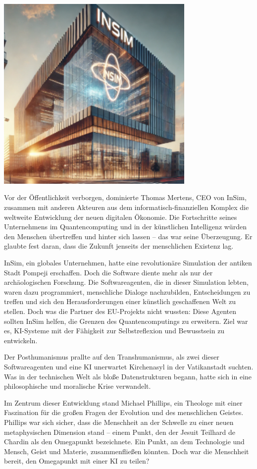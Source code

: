 \documentclass[
]{article}
\begin{document}
\includegraphics[width=3.79167in,height=3.78011in]{media/image10.png}

Vor der Öffentlichkeit verborgen, dominierte Thomas Mertens, CEO von
InSim, zusammen mit anderen Akteuren aus dem informatisch-finanziellen
Komplex die weltweite Entwicklung der neuen digitalen Ökonomie. Die
Fortschritte seines Unternehmens im Quantencomputing und in der
künstlichen Intelligenz würden den Menschen übertreffen und hinter sich
lassen -- das war seine Überzeugung. Er glaubte fest daran, dass die
Zukunft jenseits der menschlichen Existenz lag.

InSim, ein globales Unternehmen, hatte eine revolutionäre Simulation der
antiken Stadt Pompeji erschaffen. Doch die Software diente mehr als nur
der archäologischen Forschung. Die Softwareagenten, die in dieser
Simulation lebten, waren dazu programmiert, menschliche Dialoge
nachzubilden, Entscheidungen zu treffen und sich den Herausforderungen
einer künstlich geschaffenen Welt zu stellen. Doch was die Partner des
EU-Projekts nicht wussten: Diese Agenten sollten InSim helfen, die
Grenzen des Quantencomputings zu erweitern. Ziel war es, KI-Systeme mit
der Fähigkeit zur Selbstreflexion und Bewusstsein zu entwickeln.

Der Posthumanismus prallte auf den Transhumanismus, als zwei dieser
Softwareagenten und eine KI unerwartet Kirchenasyl in der Vatikanstadt
suchten. Was in der technischen Welt als bloße Datenstrukturen begann,
hatte sich in eine philosophische und moralische Krise verwandelt.

Im Zentrum dieser Entwicklung stand Michael Phillips, ein Theologe mit
einer Faszination für die großen Fragen der Evolution und des
menschlichen Geistes. Phillips war sich sicher, dass die Menschheit an
der Schwelle zu einer neuen metaphysischen Dimension stand -- einem
Punkt, den der Jesuit Teilhard de Chardin als den Omegapunkt
bezeichnete. Ein Punkt, an dem Technologie und Mensch, Geist und
Materie, zusammenfließen könnten. Doch war die Menschheit bereit, den
Omegapunkt mit einer KI zu teilen?
\end{document}
